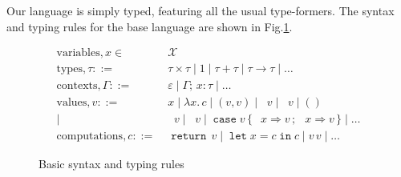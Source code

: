 \documentclass[acmsmall, screen, review, anonymous]{acmart}
\theoremstyle{definition}
\newcommand{\arr}{\rightarrow}
\newcommand{\vars}{\mathcal{X}}
\newcommand{\seq}{\,;\,}
\newcommand{\fstname}{\mathop{\pi_1}}
\newcommand{\fst}[1]{\fstname #1}
\newcommand{\sndname}{\mathop{\pi_2}}
\newcommand{\snd}[1]{\sndname #1}
\newcommand{\inlname}{\mathop{\mathtt{in}_L}}
\newcommand{\inl}[1]{\inlname #1}
\newcommand{\inrname}{\mathop{\mathtt{in}_R}}
\newcommand{\inr}[1]{\inrname #1}
\newcommand{\casename}{\mathtt{case}}
\newcommand{\case}[5]{\mathop{\casename} #1 \,\{\,\inl{#2} \Rightarrow #3 \seq \inr{#4} \Rightarrow #5 \,\}}
\newcommand{\types}{\mathrel{:}}
\newcommand{\abs}[2]{\lambda#1.\,#2}
\newcommand{\app}[2]{#1\,#2}
\newcommand{\cempty}{\varepsilon}
\newcommand{\ccons}[2]{#1;\,#2}
\newcommand{\lbind}[3]{\ccons{#1}{#2\types#3}}
\newcommand{\returnname}{\mathop{\mathtt{return}}}
\newcommand{\return}[1]{\returnname\, #1}
\newcommand{\letvname}{\mathop{\mathtt{let}}}
\newcommand{\letv}[3]{\letvname #1 = #2 \mathop{\mathtt{in}} #3}
\newcommand{\turnv}{\mathrel{\vdash_V}}
\newcommand{\turnc}{\mathrel{\vdash_C}}
\begin{document}
Our language is simply typed, featuring all the usual type-formers. The
syntax and typing rules for the base language are shown in
Fig.\ref{fig:typing-standard}.
\begin{figure}
\begin{align*}
  \mathrm{variables}, x \in\;& \vars \\
  \mathrm{types}, \tau ::=\;& \tau \times \tau \mid 1 \mid \tau + \tau
                              \mid \tau \arr \tau \mid \ldots \\
  \mathrm{contexts}, \Gamma ::=\;& \cempty \mid \lbind{\Gamma}{x}{\tau} \mid \ldots \\
  \mathrm{values}, v ::=\;& x \mid \abs{x}{c}
                           \mid (v, v) \mid \fst{v} \mid \snd{v} \mid () \\
                           \mid& \inl{v} \mid \inr{v} \mid \case{v}{x}{v}{x}{v}
                           \mid \ldots \\
  \mathrm{computations}, c ::=\;& \return{v} \mid \letv{x}{c}{c}
                                 \mid \app{v}{v} \mid \ldots
\end{align*}
\caption{Basic syntax and typing rules}
\label{fig:typing-standard}
\end{figure}
\end{document}
